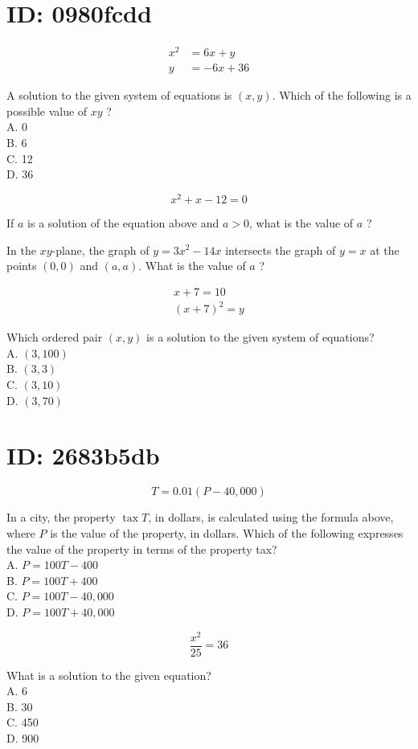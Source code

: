\section*{ID: 0980fcdd}
$$
\begin{aligned}
x^{2} & =6 x+y \\
y & =-6 x+36
\end{aligned}
$$

A solution to the given system of equations is $(x, y)$. Which of the following is a possible value of $x y$ ?\\
A. 0\\
B. 6\\
C. 12\\
D. 36

$$
x^{2}+x-12=0
$$

If $a$ is a solution of the equation above and $a>0$, what is the value of $a$ ?

In the $x y$-plane, the graph of $y=3 x^{2}-14 x$ intersects the graph of $y=x$ at the points $(0,0)$ and $(a, a)$. What is the value of $a$ ?

$$
\begin{gathered}
x+7=10 \\
(x+7)^{2}=y
\end{gathered}
$$

Which ordered pair $(x, y)$ is a solution to the given system of equations?\\
A. $(3,100)$\\
B. $(3,3)$\\
C. $(3,10)$\\
D. $(3,70)$

\section*{ID: 2683b5db}
$$
T=0.01(P-40,000)
$$

In a city, the property $\operatorname{tax} T$, in dollars, is calculated using the formula above, where $P$ is the value of the property, in dollars. Which of the following expresses the value of the property in terms of the property tax?\\
A. $P=100 T-400$\\
B. $P=100 T+400$\\
C. $P=100 T-40,000$\\
D. $P=100 T+40,000$

$$
\frac{x^{2}}{25}=36
$$

What is a solution to the given equation?\\
A. 6\\
B. 30\\
C. 450\\
D. 900

